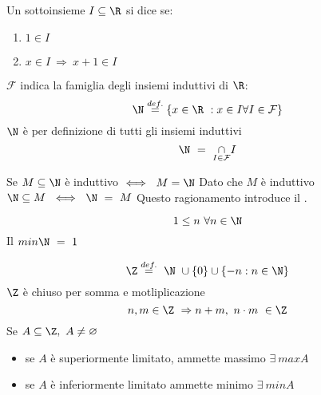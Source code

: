 \documentclass[../appunti.tex]{subfiles}
\begin{document}
\begin{defn} 
	Un sottoinsieme $ I \subseteq \R $ si dice  se:
	\begin{enumerate}
   	\item $ 1 \in I $
	\item $ x \in I\ \Rightarrow\ x + 1 \in I $
        \end{enumerate}
	$ \mathcal{F} $ indica la famiglia degli insiemi induttivi di $\R $:
	\begin{equation}
		\N \overset{def.}{=} \{ x \in \R\ : x \in I \forall I \in \mathcal{F} \} 
	\end{equation}
$\N$ è per definizione  di tutti gli insiemi induttivi 
\begin{equation}
	\N\ =\ \underset{I \in \mathcal{F}}{\cap} I
\end{equation}
\end{defn}

\begin{dimo}
	Se $M \subseteq \N $ è induttivo $ \iff\ M=\N$ \newline
	Dato che $M$ è induttivo $\N \subseteq M\ \iff\ \N\ =\ M$ \newline
	Questo ragionamento introduce il .
\end{dimo}

\begin{defn}[Il minimo di $\N$]
	\begin{equation}
		1 \leq n \ \forall n \in \N
	\end{equation}
Il $min\N\ =\ 1$
\end{defn}

\begin{defn}

	\begin{equation}
	\Z \overset{def.}{=}\ \N\ \cup \{ 0 \} \cup \{ -n:n \in \N \}
	\end{equation}	
$\Z$ è chiuso per somma e motliplicazione
	\begin{equation}
	n,m \in \Z\ \Rightarrow n+m,\ n\cdot m\ \in \Z
	\end{equation}
Se $A \subseteq \Z,\ A \neq \varnothing$
\begin{itemize}
	\item se $A$ è superiormente limitato, ammette massimo $\exists\ maxA$
	\item se $A$ è inferiormente limitato ammette minimo $\exists\ minA$
\end{itemize}
\end{defn}
\end{document}
